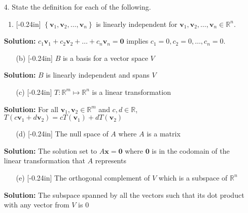 \documentclass[letterpaper,12pt]{article}
\newcommand{\set}[1]{\left\{ #1 \right\}}
\theoremstyle{definition}
\begin{document}
\begin{enumerate}
    \item[4.] State the definition for each of the following. \begin{enumerate}
        \item\reversemarginpar{}[-0.24in] $\set{\mathbf{v}_1,\mathbf{v}_2,\ldots,\mathbf{v}_n}$ is linearly independent for $\mathbf{v}_1,\mathbf{v}_2,\ldots,\mathbf{v}_n \in \mathbb{R}^n$.
        \end{enumerate}
        \begin{mdframed}
            \textbf{Solution:} $c_1\mathbf{v}_1+c_2\mathbf{v}_2+\ldots+c_n\mathbf{v}_n= \mathbf{0}$ implies $c_1=0,c_2=0,\ldots,c_n=0$.
        \end{mdframed}
          \vspace{0.6in}
        \begin{enumerate}
        \item[(b)]\reversemarginpar{}[-0.24in] $B$ is a basis for a vector space $V$
        \end{enumerate}
        \begin{mdframed}
            \textbf{Solution:} $B$ is linearly independent and spans $V$
        \end{mdframed}
        \begin{enumerate}
        \vspace{0.6in}
        \item[(c)]\reversemarginpar{}[-0.24in] $T:\mathbb{R}^m\mapsto \mathbb{R}^n$ is a linear transformation
        \end{enumerate}
         \begin{mdframed}
            \textbf{Solution:} For all $\mathbf{v}_1,\mathbf{v}_2 \in \mathbb{R}^m$ and $c,d \in \mathbb{R}$, $T(c\mathbf{v}_1+d\mathbf{v}_2) = cT(\mathbf{v}_1)+dT(\mathbf{v}_2)$
        \end{mdframed}
        \vspace{0.6in}
        \begin{enumerate}
        \item[(d)]\reversemarginpar{}[-0.24in] The null space of $A$ where $A$ is a matrix
        \end{enumerate}
        \begin{mdframed}
            \textbf{Solution:} The solution set to $A\mathbf{x} = \mathbf{0}$ where $\mathbf{0}$ is in the codomain of the linear transformation that $A$ represents
        \end{mdframed}
        \vspace{0.4in}
        \begin{enumerate}
        \item[(e)]\reversemarginpar{}[-0.24in] The orthogonal complement of $V$ which is a subspace of $\mathbb{R}^n$
    \end{enumerate}
    \begin{mdframed}
        \textbf{Solution:} The subspace spanned by all the vectors such that its dot product with any vector from $V$ is 0
    \end{mdframed}
\end{enumerate}
\end{document}
